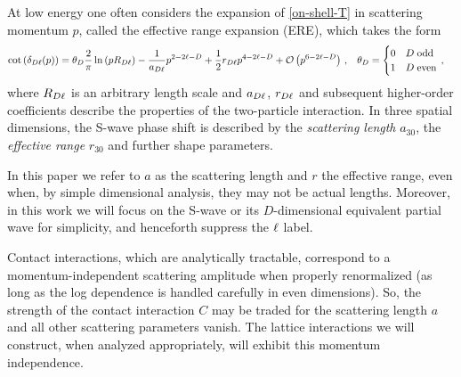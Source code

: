 At low energy one often considers the expansion of \eqref{on-shell-T} in scattering momentum $p$, called the effective range expansion (ERE), which takes the form \cite{Hammer:2010fw}
\begin{align}
    \label{eq:ere}
    \cot \left(\delta_{D\ell}(p)\right)
    &=
    \theta_D \frac{2}{\pi}  \ln \left(p R_{D\ell}\right)
    -
    \frac{1}{a_{D\ell}} p^{2 - 2 \ell - D} +\frac{1}{2} r_{D\ell} p^{4 - 2 \ell - D} + \mathcal{O}\left(p^{6 - 2 \ell - D}\right)
    \, , &
    \theta_D &= \begin{cases}
        0 & D \;\text{odd} \\ 1 & D \;\text{even}
    \end{cases}
    \, ,
\end{align}
where $R_{D \ell}$ is an arbitrary length scale and $a_{D\ell}$, $r_{D\ell}$ and subsequent higher-order coefficients describe the properties of the two-particle interaction.
In three spatial dimensions, the S-wave phase shift is described by the \emph{scattering length} $a_{30}$, the \emph{effective range} $r_{30}$ and further shape parameters.

In this paper we refer to $a$ as the scattering length and $r$ the effective range, even when, by simple dimensional analysis, they may not be actual lengths.
Moreover, in this work we will focus on the S-wave or its $D$-dimensional equivalent partial wave for simplicity, and henceforth suppress the $\ell$ label.

Contact interactions, which are analytically tractable, correspond to a momentum-independent scattering amplitude when properly renormalized (as long as the log dependence is handled carefully in even dimensions).
So, the strength of the contact interaction $C$ may be traded for the scattering length $a$ and all other scattering parameters vanish.
The lattice interactions we will construct, when analyzed appropriately, will exhibit this momentum independence.
